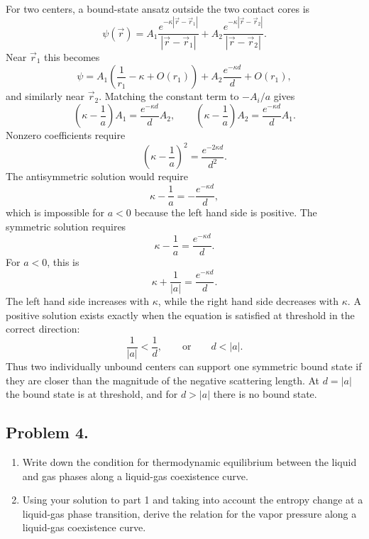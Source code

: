\begin{solution}
For two centers, a bound-state ansatz outside the two contact cores is
\[
    \psi(\vec r)
    =
    A_1\frac{e^{-\kappa|\vec r-\vec r_1|}}{|\vec r-\vec r_1|}
    +
    A_2\frac{e^{-\kappa|\vec r-\vec r_2|}}{|\vec r-\vec r_2|}.
\]
Near $\vec r_1$ this becomes
\[
    \psi
    =
    A_1\left(\frac{1}{r_1}-\kappa+O(r_1)\right)
    +A_2\frac{e^{-\kappa d}}{d}+O(r_1),
\]
and similarly near $\vec r_2$. Matching the constant term to $-A_i/a$ gives
\[
    \left(\kappa-\frac{1}{a}\right)A_1
    =\frac{e^{-\kappa d}}{d}A_2,
    \qquad
    \left(\kappa-\frac{1}{a}\right)A_2
    =\frac{e^{-\kappa d}}{d}A_1 .
\]
Nonzero coefficients require
\[
    \left(\kappa-\frac{1}{a}\right)^2
    =\frac{e^{-2\kappa d}}{d^2}.
\]
The antisymmetric solution would require
\[
    \kappa-\frac{1}{a}=-\frac{e^{-\kappa d}}{d},
\]
which is impossible for $a<0$ because the left hand side is positive. The symmetric solution requires
\[
    \kappa-\frac{1}{a}=\frac{e^{-\kappa d}}{d}.
\]
For $a<0$, this is
\[
    \kappa+\frac{1}{|a|}=\frac{e^{-\kappa d}}{d}.
\]
The left hand side increases with $\kappa$, while the right hand side decreases with $\kappa$. A positive solution exists exactly when the equation is satisfied at threshold in the correct direction:
\[
    \frac{1}{|a|}<\frac{1}{d},
    \qquad\text{or}\qquad
    d<|a|.
\]
Thus two individually unbound centers can support one symmetric bound state if they are closer than the magnitude of the negative scattering length. At $d=|a|$ the bound state is at threshold, and for $d>|a|$ there is no bound state.
\end{solution}

\subsection*{Problem 4.}

\begin{exercise}
\label{physics:2026:4}
\begin{enumerate}
    \item Write down the condition for thermodynamic equilibrium between the liquid and gas phases along a liquid-gas coexistence curve.
    \item Using your solution to part 1 and taking into account the entropy change at a liquid-gas phase transition, derive the relation for the vapor pressure along a liquid-gas coexistence curve.
\end{enumerate}
\end{exercise}

